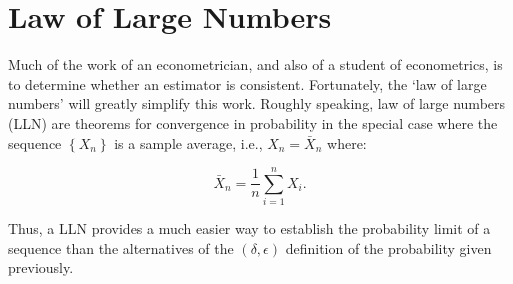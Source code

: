\documentclass[english,12pt]{book}\usepackage[]{graphicx}\usepackage[]{xcolor}
\begin{document}
\section{Law of Large Numbers}

Much of the work of an econometrician, and also of a student of econometrics, is to determine whether an estimator is consistent. Fortunately, the `law of large numbers' will greatly simplify this work. Roughly speaking, law of large numbers (LLN) are theorems for convergence in probability in the special case where the sequence $\left\lbrace X_n \right\rbrace$ is a sample average, i.e., $X_n = \bar{X}_n$ where:

\begin{equation*}
\bar{X}_n = \frac{1}{n}\sum_{i = 1}^n X_i.
\end{equation*}

Thus, a LLN provides a much easier way to establish the probability limit of a sequence than the alternatives of the $(\delta, \epsilon)$ definition of the probability given previously. 





\end{document}
